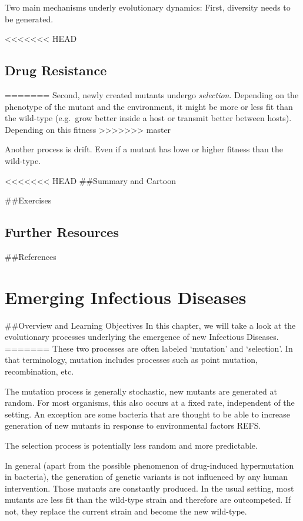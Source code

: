 \documentclass[]{book}
\theoremstyle{definition}
\theoremstyle{definition}
\theoremstyle{definition}
\theoremstyle{remark}
\begin{document}
Two main mechanisms underly evolutionary dynamics: First, diversity
needs to be generated.

<<<<<<< HEAD
\hypertarget{drug-resistance}{%
\section{Drug Resistance}\label{drug-resistance}}
=======
Second, newly created mutants undergo \emph{selection}. Depending on the
phenotype of the mutant and the environment, it might be more or less
fit than the wild-type (e.g.~grow better inside a host or transmit
better between hosts). Depending on this fitness
>>>>>>> master

Another process is drift. Even if a mutant has lowe or higher fitness
than the wild-type.

<<<<<<< HEAD
\#\#Summary and Cartoon

\#\#Exercises

\hypertarget{further-resources-8}{%
\section{Further Resources}\label{further-resources-8}}

\#\#References

\hypertarget{emerging-infectious-diseases}{%
\chapter{Emerging Infectious
Diseases}\label{emerging-infectious-diseases}}

\#\#Overview and Learning Objectives In this chapter, we will take a
look at the evolutionary processes underlying the emergence of new
Infectious Diseases.
=======
These two processes are often labeled `mutation' and `selection'. In
that terminology, mutation includes processes such as point mutation,
recombination, etc.

The mutation process is generally stochastic, new mutants are generated
at random. For most organisms, this also occurs at a fixed rate,
independent of the setting. An exception are some bacteria that are
thought to be able to increase generation of new mutants in response to
environmental factors REFS.

The selection process is potentially less random and more predictable.

In general (apart from the possible phenomenon of drug-induced
hypermutation in bacteria), the generation of genetic variants is not
influenced by any human intervention. Those mutants are constantly
produced. In the usual setting, most mutants are less fit than the
wild-type strain and therefore are outcompeted. If not, they replace the
current strain and become the new wild-type.
\end{document}
